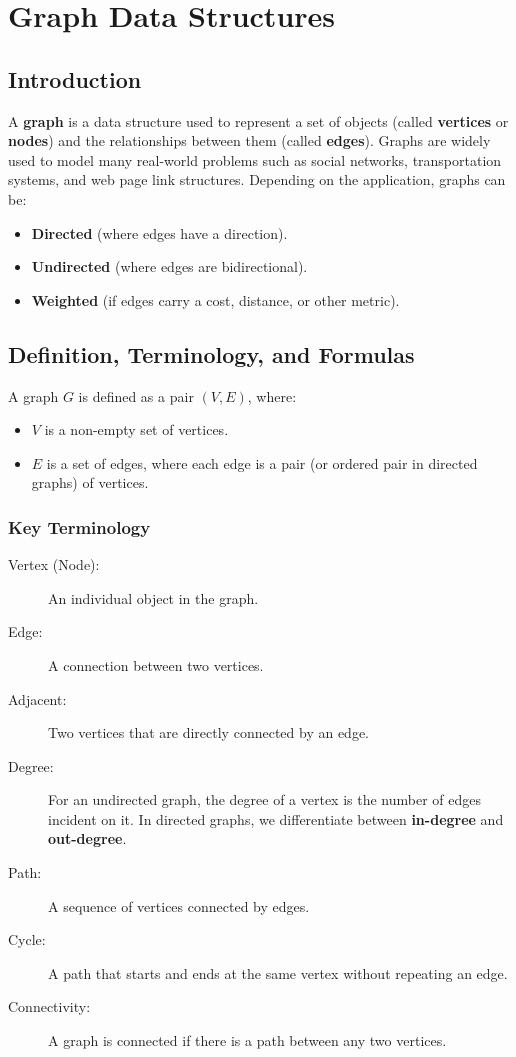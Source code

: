 \chapter{Graph Data Structures}

\section{Introduction}
A \textbf{graph} is a data structure used to represent a set of objects (called \textbf{vertices} or \textbf{nodes}) and the relationships between them (called \textbf{edges}). Graphs are widely used to model many real-world problems such as social networks, transportation systems, and web page link structures. Depending on the application, graphs can be:
\begin{itemize}
    \item \textbf{Directed} (where edges have a direction).
    \item \textbf{Undirected} (where edges are bidirectional).
    \item \textbf{Weighted} (if edges carry a cost, distance, or other metric).
\end{itemize}

\section{Definition, Terminology, and Formulas}
A graph \( G \) is defined as a pair \( (V, E) \), where:
\begin{itemize}
    \item \( V \) is a non-empty set of vertices.
    \item \( E \) is a set of edges, where each edge is a pair (or ordered pair in directed graphs) of vertices.
\end{itemize}

\subsection{Key Terminology}
\begin{description}
    \item[Vertex (Node):] An individual object in the graph.
    \item[Edge: ] A connection between two vertices.
    \item[Adjacent: ] Two vertices that are directly connected by an edge.
    \item[Degree: ] For an undirected graph, the degree of a vertex is the number of edges incident on it. In directed graphs, we differentiate between \textbf{in-degree} and \textbf{out-degree}.
    \item[Path: ] A sequence of vertices connected by edges.
    \item[Cycle: ] A path that starts and ends at the same vertex without repeating an edge.
    \item[Connectivity: ] A graph is connected if there is a path between any two vertices.
\end{description}

